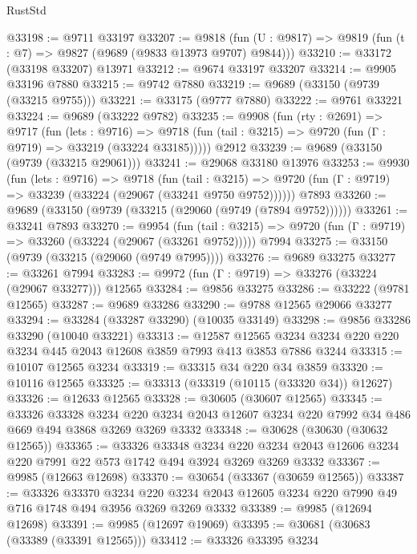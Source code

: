 \begin{lexlean}{RustStd}
\begin{coremodule}
@33198 := @9711 @33197
@33207 := @9818
    (fun (U : @9817) => @9819 (fun (t : @7) => @9827 (@9689 (@9833 @13973 @9707) @9844)))
@33210 := @33172 (@33198 @33207) @13971
@33212 := @9674 @33197 @33207
@33214 := @9905 @33196 @7880
@33215 := @9742 @7880
@33219 := @9689 (@33150 (@9739 (@33215 @9755)))
@33221 := @33175 (@9777 @7880)
@33222 := @9761 @33221
@33224 := @9689 (@33222 @9782)
@33235 := @9908
    (fun (rty : @2691) =>
    @9717
      (fun (lets : @9716) =>
      @9718 (fun (tail : @3215) => @9720 (fun (Γ : @9719) => @33219 (@33224 @33185)))))
    @2912
@33239 := @9689 (@33150 (@9739 (@33215 @29061)))
@33241 := @29068 @33180 @13976
@33253 := @9930
    (fun (lets : @9716) =>
    @9718
      (fun (tail : @3215) =>
      @9720 (fun (Γ : @9719) => @33239 (@33224 (@29067 (@33241 @9750 @9752))))))
    @7893
@33260 := @9689 (@33150 (@9739 (@33215 (@29060 (@9749 (@7894 @9752))))))
@33261 := @33241 @7893
@33270 := @9954
    (fun (tail : @3215) => @9720 (fun (Γ : @9719) => @33260 (@33224 (@29067 (@33261 @9752)))))
    @7994
@33275 := @33150 (@9739 (@33215 (@29060 (@9749 @7995))))
@33276 := @9689 @33275
@33277 := @33261 @7994
@33283 := @9972 (fun (Γ : @9719) => @33276 (@33224 (@29067 @33277))) @12565
@33284 := @9856 @33275
@33286 := @33222 (@9781 @12565)
@33287 := @9689 @33286
@33290 := @9788 @12565 @29066 @33277
@33294 := @33284 (@33287 @33290) (@10035 @33149)
@33298 := @9856 @33286 @33290 (@10040 @33221)
@33313 := @12587
    @12565
    @3234
    @3234
    @220
    @220
    @3234
    @445
    @2043
    @12608
    @3859
    @7993
    @413
    @3853
    @7886
    @3244
@33315 := @10107 @12565 @3234
@33319 := @33315 @34 @220 @34 @3859
@33320 := @10116 @12565
@33325 := @33313 (@33319 (@10115 (@33320 @34)) @12627)
@33326 := @12633 @12565
@33328 := @30605 (@30607 @12565)
@33345 := @33326
    @33328
    @3234
    @220
    @3234
    @2043
    @12607
    @3234
    @220
    @7992
    @34
    @486
    @669
    @494
    @3868
    @3269
    @3269
    @3332
@33348 := @30628 (@30630 (@30632 @12565))
@33365 := @33326
    @33348
    @3234
    @220
    @3234
    @2043
    @12606
    @3234
    @220
    @7991
    @22
    @573
    @1742
    @494
    @3924
    @3269
    @3269
    @3332
@33367 := @9985 (@12663 @12698)
@33370 := @30654 (@33367 (@30659 @12565))
@33387 := @33326
    @33370
    @3234
    @220
    @3234
    @2043
    @12605
    @3234
    @220
    @7990
    @49
    @716
    @1748
    @494
    @3956
    @3269
    @3269
    @3332
@33389 := @9985 (@12694 @12698)
@33391 := @9985 (@12697 @19069)
@33395 := @30681 (@30683 (@33389 (@33391 @12565)))
@33412 := @33326
    @33395
    @3234

\end{coremodule}
\end{lexlean}
